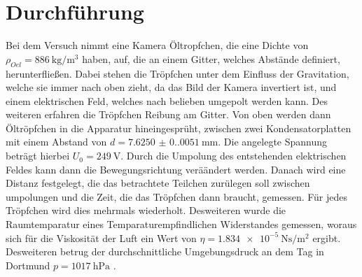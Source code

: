\section{Durchführung}
Bei dem Versuch nimmt eine Kamera Öltropfchen, die eine Dichte von $\rho_{Oel}=\qty{886}{\kilo\gram\per\cubic\meter}$ 
haben, auf, die an einem Gitter, welches Abstände definiert, herunterfließen.
Dabei stehen die Tröpfchen unter dem Einfluss der Gravitation, welche sie immer nach oben zieht,
da das Bild der Kamera invertiert ist, und einem elektrischen Feld, welches nach belieben umgepolt werden kann. 
Des weiteren erfahren die Tröpfchen Reibung am Gitter. Von oben werden dann Öltröpfchen in die Apparatur 
hineingesprüht, zwischen zwei Kondensatorplatten mit einem Abstand von $d=\qty{7.6250(0.0051)}{\milli\meter}$. 
Die angelegte Spannung beträgt hierbei $U_0=\qty{249}{\volt}$. Durch die Umpolung des entstehenden elektrischen
Feldes kann dann die Bewegungsrichtung veräändert werden. Danach wird eine Distanz festgelegt, die das betrachtete
Teilchen zurülegen soll zwischen umpolungen und die Zeit, die das Tröpfchen dann braucht, gemessen. Für jedes Tröpfchen
wird dies mehrmals wiederholt. Desweiteren wurde die Raumtemparatur eines Temparaturempfindlichen
Widerstandes gemessen, woraus sich für die Viskosität der Luft ein Wert von $\eta=\qty{1.834e-5}{\newton\second\per\meter\squared}$
ergibt. Desweiteren betrug der durchschnittliche Umgebungsdruck an dem Tag in Dortmund $p=\qty{1017}{\hecto\pascal}$ \cite{Luftdruck}.
\label{sec:Durchführung}
